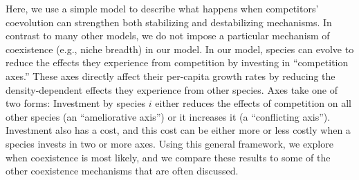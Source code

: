 Here, we use a simple model to describe what happens when competitors'
coevolution can strengthen both stabilizing and destabilizing mechanisms.
In contrast to many other models, we do not impose a particular mechanism
of coexistence (e.g., niche breadth) in our model.
In our model, species can evolve to reduce the effects they experience from
competition by investing in ``competition axes.''
These axes directly affect their per-capita growth rates by reducing the 
density-dependent effects they experience from other species.
Axes take one of two forms: 
Investment by species $i$ either reduces the effects of competition on all other species (an ``ameliorative axis'') or 
it increases it (a ``conflicting axis'').
Investment also has a cost, and this cost can be either more or less
costly when a species invests in two or more axes.
Using this general framework, we explore when coexistence is most likely,
and we compare these results to some of the other coexistence mechanisms
that are often discussed.












































